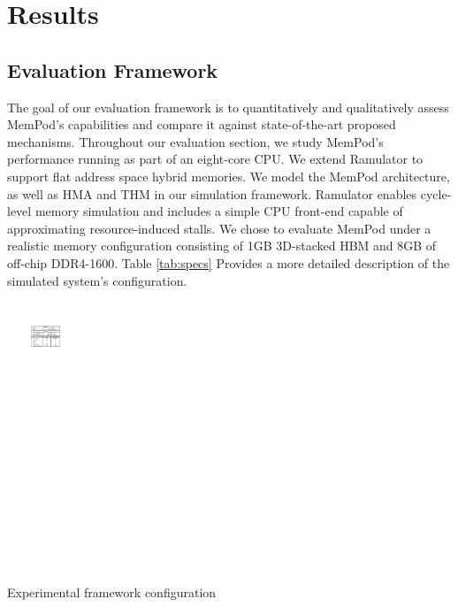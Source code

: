 \section{Results}
\label{sec:Results}

\subsection{Evaluation Framework}
\label{sub:Evaluation}


The goal of our evaluation framework is to quantitatively and qualitatively assess MemPod's capabilities and compare it against state-of-the-art proposed mechanisms. Throughout our evaluation section, we study MemPod's performance running as part of an eight-core CPU. We extend Ramulator \cite{kim-ramulator} to support flat address space hybrid memories. We model the MemPod architecture,
as well as HMA and THM in our simulation framework. Ramulator enables 
cycle-level memory simulation and includes a simple CPU front-end capable of approximating resource-induced stalls. We chose to evaluate MemPod under a realistic memory configuration consisting of 1GB 3D-stacked HBM \cite{JEDEC-HBM-REVISED} and 8GB of off-chip DDR4-1600. Table \ref{tab:specs} Provides a more detailed description of the simulated system's configuration.

\begin{table}[t]
  \includegraphics[width=0.46\textwidth]{figures/specs_table.pdf}
  \caption{Experimental framework configuration}
  \label{tab:specs}
\end{table}

